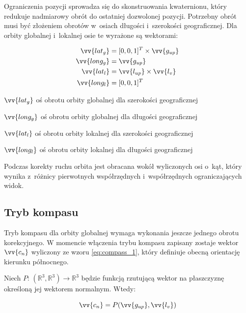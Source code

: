 Ograniczenia pozycji sprowadza się do skonstruowania kwaternionu, który redukuje nadmiarowy obrót do ostatniej dozwolonej pozycji. Potrzebny obrót musi być złożeniem obrotów w~osiach długości i~szerokości geograficznej.
Dla orbity globalnej i~lokalnej osie te wyrażone są wektorami:
\begin{samepage}
  \begin{align}
      \vv{lat_g} &= [0, 0, 1]^T \times \vv{g_{up}} \\
      \vv{long_g} &= \vv{g_{up}} \\
      \vv{lat_l} &= \vv{l_{up}} \times \vv{l_v} \\
      \vv{long_l} &= [0, 0, 1]^T
  \end{align}
  \begin{eqexpl}[25mm]
      \item {$\vv{lat_g}$} oś obrotu orbity globalnej dla szerokości geograficznej
      \item {$\vv{long_g}$} oś obrotu orbity globalnej dla długości geograficznej
      \item {$\vv{lat_l}$} oś obrotu orbity lokalnej dla szerokości geograficznej
      \item {$\vv{long_l}$} oś obrotu orbity lokalnej dla długości geograficznej
  \end{eqexpl}
  \vspace{\baselineskip}
\end{samepage}

Podczas korekty ruchu orbita jest obracana wokół wyliczonych osi o~kąt, który wynika z~różnicy pierwotnych współrzędnych i~współrzędnych ograniczających widok.

\subsection{Tryb kompasu}

Tryb kompasu dla orbity globalnej wymaga wykonania jeszcze jednego obrotu korekcyjnego. W momencie włączenia trybu kompasu zapisany zostaje wektor $\vv{c_n}$ wyliczony ze wzoru \ref{eq:compass_1}, który definiuje obecną orientację kierunku północnego.

Niech $P:\,(\mathbb{R}^3, \mathbb{R}^3) \to \mathbb{R}^3$ będzie funkcją rzutującą wektor na płaszczyznę określoną jej wektorem normalnym. Wtedy:

\begin{samepage}
  \begin{equation}
    \label{eq:compass_1}
      \vv{c_n} = P(\vv{g_{up}}, \vv{l_v})
  \end{equation}
  \vspace{\baselineskip}
\end{samepage}



